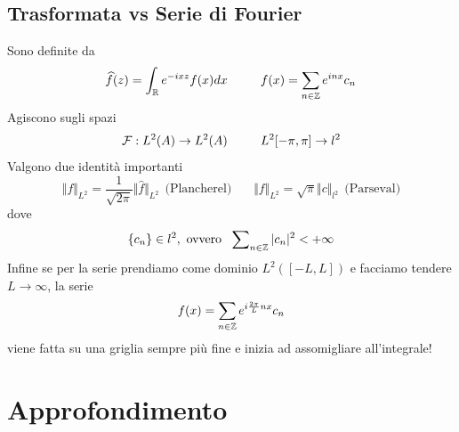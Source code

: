 \section{Trasformata vs Serie di Fourier}

Sono definite da
\begin{equation*}
\widehat{f}(z) = \int_{\mathbb{R}} e^{- ixz} f(x) dx\ \ \ \ \ \ \ \ f(x) = \sum_{n\in \mathbb{Z}} e^{inx} c_{n}
\end{equation*}
Agiscono sugli spazi
\begin{equation*}
\mathcal{F} : L^{2}(A)\rightarrow L^{2}(A) \ \ \ \ \ \ \ \ L^{2}[ - \pi, \pi]\rightarrow l^{2}
\end{equation*}
Valgono due identità importanti
\begin{equation*}
\Vert f \Vert_{L^{2}} = \frac{1}{\sqrt{2\pi}} \Vert \hat{f} \Vert_{L^{2}} \ \ \text{(Plancherel)} \ \ \ \ \ \ \ \ \Vert f \Vert_{L^{2}} = \sqrt{\pi} \Vert c \Vert_{l^{2}} \ \ \text{(Parseval)}
\end{equation*}
dove
\begin{equation*}
\{c_{n}\} \in l^{2}, \ \text{ovvero} \ \ \sum\nolimits_{n\in \ZZ}| c_{n}|^{2} < + \infty
\end{equation*}
Infine se per la serie prendiamo come dominio $L^{2}([ - L, L])$ e facciamo tendere $L\rightarrow \infty $, la serie
\begin{equation*}
f(x) = \sum_{n\in \mathbb{Z}} e^{i\frac{2\pi}{L} nx} c_{n}
\end{equation*}
viene fatta su una griglia sempre più fine e inizia ad assomigliare all'integrale!



\makeatletter
\def\cleardoublepage{\clearpage\if@twoside \ifodd\c@page\else
    \hbox{}
    \vspace*{\fill}
    \vspace{\fill}
    \thispagestyle{empty}
    \newpage
    \if@twocolumn\hbox{}\newpage\fi\fi\fi}
\makeatother

\pagestyle{fancy}
\renewcommand{\chaptermark}[1]{\markboth{#1}{}}
\renewcommand{\sectionmark}[1]{\markright{\thesection\ #1}}
\fancyhf{}
\fancyhead[LE,RO]{\scshape\thepage}
\fancyhead[LO]{\scshape\footnotesize\nouppercase{\rightmark}} 
\fancyhead[RE]{\scshape\footnotesize\nouppercase{\leftmark}} 
 

\appendix 


\chapter{Approfondimento}
\label{myprod}

